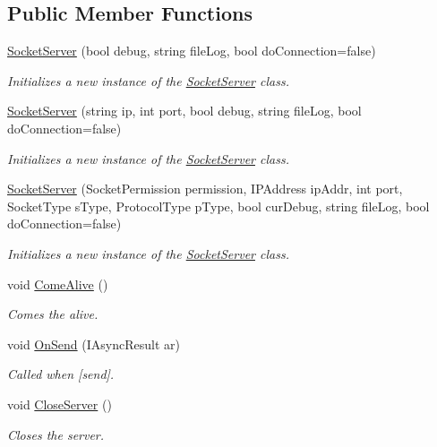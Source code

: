 \subsection*{Public Member Functions}
\begin{DoxyCompactItemize}
\item 
\hyperlink{class_lerp2_a_p_i_1_1_communication_1_1_sockets_1_1_socket_server_a0345e504a8bbd0b825865dfd58693b37}{Socket\+Server} (bool debug, string file\+Log, bool do\+Connection=false)
\begin{DoxyCompactList}\small\item\em Initializes a new instance of the \hyperlink{class_lerp2_a_p_i_1_1_communication_1_1_sockets_1_1_socket_server}{Socket\+Server} class. \end{DoxyCompactList}\item 
\hyperlink{class_lerp2_a_p_i_1_1_communication_1_1_sockets_1_1_socket_server_aae16b2d142302a8442c85eaa5816d12b}{Socket\+Server} (string ip, int port, bool debug, string file\+Log, bool do\+Connection=false)
\begin{DoxyCompactList}\small\item\em Initializes a new instance of the \hyperlink{class_lerp2_a_p_i_1_1_communication_1_1_sockets_1_1_socket_server}{Socket\+Server} class. \end{DoxyCompactList}\item 
\hyperlink{class_lerp2_a_p_i_1_1_communication_1_1_sockets_1_1_socket_server_a6d7ed3dc2852751fe7b5bbcde9f69d9b}{Socket\+Server} (Socket\+Permission permission, I\+P\+Address ip\+Addr, int port, Socket\+Type s\+Type, Protocol\+Type p\+Type, bool cur\+Debug, string file\+Log, bool do\+Connection=false)
\begin{DoxyCompactList}\small\item\em Initializes a new instance of the \hyperlink{class_lerp2_a_p_i_1_1_communication_1_1_sockets_1_1_socket_server}{Socket\+Server} class. \end{DoxyCompactList}\item 
void \hyperlink{class_lerp2_a_p_i_1_1_communication_1_1_sockets_1_1_socket_server_a7782b604119b7ea3f1b0bf46781a8047}{Come\+Alive} ()
\begin{DoxyCompactList}\small\item\em Comes the alive. \end{DoxyCompactList}\item 
void \hyperlink{class_lerp2_a_p_i_1_1_communication_1_1_sockets_1_1_socket_server_aae56222526c8f6e8aca309960e07def9}{On\+Send} (I\+Async\+Result ar)
\begin{DoxyCompactList}\small\item\em Called when \mbox{[}send\mbox{]}. \end{DoxyCompactList}\item 
void \hyperlink{class_lerp2_a_p_i_1_1_communication_1_1_sockets_1_1_socket_server_a6af5fb9d8c9e173103bc5c782a34d05a}{Close\+Server} ()
\begin{DoxyCompactList}\small\item\em Closes the server. \end{DoxyCompactList}\end{DoxyCompactItemize}
